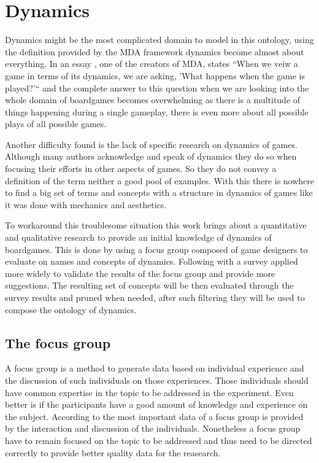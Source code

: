\section{Dynamics}
Dynamics might be the most complicated domain to model in this ontology, using the definition provided by the MDA framework dynamics become almost about everything. In an essay \cite{leblanc2006tools}, one of the creators of MDA, states ``When we veiw a game in terms of its dynamics, we are asking, 'What happens when the game is played?'`` and the complete answer to this question when we are looking into the whole domain of boardgames becomes overwhelming as there is a multitude of things happening during a single gameplay, there is even more about all possible plays of all possible games. 

Another difficulty found is the lack of specific research on dynamics of games. Although many authors acknowledge and speak of dynamics they do so when focusing their efforts in other aspects of games. So they do not convey a definition of the term neither a good pool of examples. With this there is nowhere to find a big set of terms and concepts with a structure in dynamics of games like it was done with mechanics and aesthetics.

To workaround this troublesome situation this work brings about a quantitative and qualitative research to provide an initial knowledge of dynamics of boardgames. This is done by using a focus group composed of game designers to evaluate on names and concepts of dynamics. Following with a survey applied more widely to validate the results of the focus group and provide more suggestions. The resulting set of concepts will be then evaluated through the survey results and pruned when needed, after such filtering they will be used to compose the ontology of dynamics.

\subsection{The focus group}

A focus group is a method to generate data based on individual experience and the discussion of such individuals on those experiences. Those individuals should have common expertise in the topic to be addressed in the experiment. Even better is if the participants have a good amount of knowledge and experience on the subject. According to \cite{jenny_methodologyfocusgroup_1994} the most important data of a focus group is provided by the interaction and discussion of the individuals. Nonetheless a focus group have to remain focused on the topic to be addressed and thus need to be directed correctly to provide better quality data for the reasearch. \citep{liamputtong_focusgroup_2011,rabiee_focus-group_2004,jenny_methodologyfocusgroup_1994}

